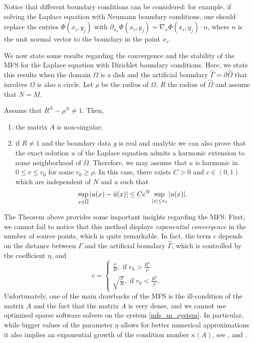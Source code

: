Notice that different boundary conditions can be considered: for example, if solving the Laplace equation with Neumann boundary conditions, one should replace the entries \(\Phi(x_i,y_j)\) with \(\partial_{n_x}\Phi(x_i,y_j) = \nabla_x\Phi(x_i,y_j)\cdot n\), where \(n\) is the unit normal vector to the boundary in the point \(x_i\).

We now state some results regarding the convergence and the stability of the MFS for the Laplace equation with Dirichlet boundary conditions. Here, we state this results when the domain \(\Omega\) is a disk and the artificial boundary \(\hat{\Gamma} = \partial \hat{\Omega}\) that involves \(\Omega\) is also a circle. Let \(\rho\) be the radius of \(\Omega\), \(R\) the radius of \(\hat{\Omega}\) and assume that \(N=M\).
\begin{theorem}\label{mfs_lap_conv}
    Assume that \(R^N - \rho^N \neq 1\). Then,
    \begin{enumerate}
        \item the matrix \(A\) is non-singular;
        \item if \(R \neq 1\) and the boundary data \(g\) is real and analytic we can also prove that the exact solution \(u\) of the Laplace equation admits a harmonic extension to some neighborhood of \(\overline{\Omega}\). Therefore, we may assume that \(u\) is harmonic in \(0 \leq r \leq r_0\) for some \(r_0 \geq \rho\). In this case, there exists \(C > 0\) and \(c \in (0, 1)\) which are independent of \(N\) and \(u\) such that
        \[
            \sup_{\substack{x \in \overline{\Omega}}} \abs{u(x) - \tilde{u}(x)} \leq C c^N \sup_{\substack{\abs{x}\leq r_0}}\abs{u(x)}.
        \]
    \end{enumerate}
\end{theorem}
The Theorem above provides some important insights regarding the MFS. First, we cannot fail to notice that this method displays \textit{exponential convergence} in the number of source points, which is quite remarkable. In fact, the term \(c\) depends on the distance between \(\Gamma\) and the artificial boundary \(\hat{\Gamma}\), which is controlled by the coefficient \(\eta\), and
\[
    c = \begin{cases}
        \frac{\rho}{R}, \text{ if } r_0 > \frac{R^2}{\rho}\\
        \sqrt{\frac{\rho}{R}}, \text{ if } r_0 < \frac{R^2}{\rho}.
    \end{cases}
\]
Unfortunately, one of the main drawbacks of the MFS is the ill-condition of the matrix \(A\) and the fact that the matrix \(A\) is very dense, and we cannot use optimized sparse software solvers on the system \eqref{mfs_m_system}. In particular, while bigger values of the parameter \(\eta\) allows for better numerical approximations it also implies an exponential growth of the condition number \(\kappa(A)\), see \cite{christiansen1981condition}, \cite{kitagawa1988numerical} and \cite{kitagawa1991asymptotic}.

